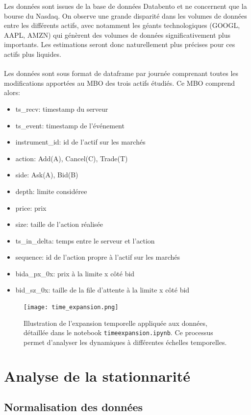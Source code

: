 \documentclass[10pt,a4paper]{article}
\theoremstyle{definition}
\theoremstyle{remark}
\begin{document}
Les données sont issues de la base de données Databento et ne concernent que la bourse du Nasdaq. On observe une grande disparité dans les volumes de données entre les différents actifs, avec notamment les géants technologiques (GOOGL, AAPL, AMZN) qui génèrent des volumes de données significativement plus importants. Les estimations seront donc naturellement plus précises pour ces actifs plus liquides.
\\
\\
Les données sont sous format de dataframe par journée comprenant toutes les modifications apportées au MBO des trois actifs étudiés. Ce MBO comprend alors:
\begin{itemize}
    \item ts\_recv: timestamp du serveur 
    \item ts\_event: timestamp de l'événement     
    \item instrument\_id: id de l'actif sur les marchés
    \item action: Add(A), Cancel(C), Trade(T)
    \item side: Ask(A), Bid(B)
    \item depth: limite considéree
    \item price: prix
    \item size: taille de l'action réalisée
    \item ts\_in\_delta: temps entre le serveur et l'action
    \item sequence: id de l'action propre à l'actif sur les marchés
    \item bid{a}\_px\_0x: prix à la limite x côté bid
    \item bid\_sz\_0x: taille de la file d'attente à la limite x côté bid
\end{itemize}

\begin{figure}[h!]
\centering
        \texttt{[image: time\_expansion.png]}
    \caption{Illustration de l'expansion temporelle appliquée aux données, détaillée dans le notebook \texttt{timeexpansion.ipynb}. Ce processus permet d'analyser les dynamiques à différentes échelles temporelles.}
    \label{fig:time_expansion}
\end{figure}

\newpage
\section{Analyse de la stationnarité}

\subsection{Normalisation des données}
\end{document}
